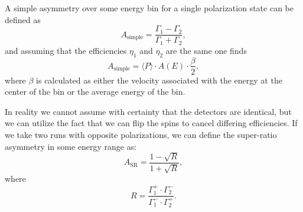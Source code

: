 A simple asymmetry over some energy bin for a single 
polarization state can be defined as
%
\begin{equation} 
A_{\mathrm{simple}} = \frac{\Gamma_1 - \Gamma_2}{\Gamma_1 + \Gamma_2}, 
\end{equation}
%
\noindent and assuming that the efficiencies $\eta_1$ and $\eta_2$ are the same one
finds
%
\begin{equation} \label{eq:Asimple}
A_{\mathrm{simple}} = \langle P \rangle \cdot A(E) \cdot \frac{\beta}{2},
\end{equation}
%
\noindent where $\beta$ is calculated as either the velocity associated with the energy 
at the center of the bin or the average energy of the bin.   

In reality we cannot assume with certainty that the detectors are identical, but we can 
utilize the fact that we can flip the spins to cancel differing efficiencies. If we 
take two runs with opposite polarizations, we can define the super-ratio asymmetry in 
some energy range as:
%
\begin{equation} \label{eq:A_SR_frac}
A_{\mathrm{SR}} = \frac{1-\sqrt{R}}{1+\sqrt{R}} ,
\end{equation}
\noindent where 
\begin{equation} \label{eq:R}
 R = \frac{\Gamma_{1}^+ \cdot \Gamma_{2}^-}{\Gamma_{1}^- \cdot \Gamma_{2}^+}.
\end{equation}

